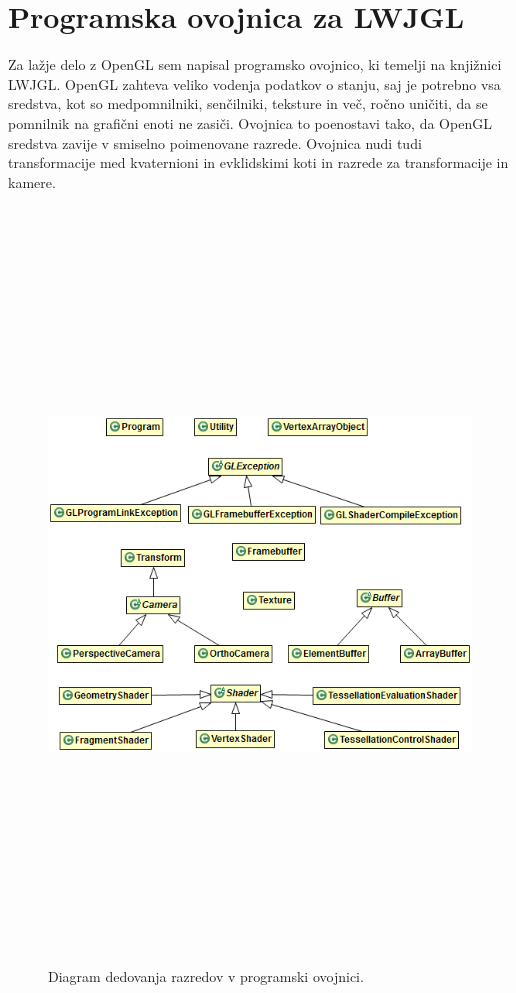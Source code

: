 \documentclass[a4paper, 12pt]{book}
\begin{document}
\section{Programska ovojnica za LWJGL}

Za lažje delo z OpenGL sem napisal programsko ovojnico, ki temelji na knjižnici LWJGL. OpenGL zahteva veliko vodenja podatkov o stanju, saj je potrebno vsa sredstva, kot so medpomnilniki, senčilniki, teksture in več, ročno uničiti, da se pomnilnik na grafični enoti ne zasiči. Ovojnica to poenostavi tako, da OpenGL sredstva zavije v smiselno poimenovane razrede. Ovojnica nudi tudi transformacije med kvaternioni in evklidskimi koti in razrede za transformacije in kamere.

\begin{figure}[h!]
\begin{center}
\includegraphics[width=\textwidth, height=20cm, keepaspectratio=true]{class_diagram.png}
\end{center}
\caption{Diagram dedovanja razredov v programski ovojnici.}
\label{classdiagram}
\end{figure}
\end{document}
